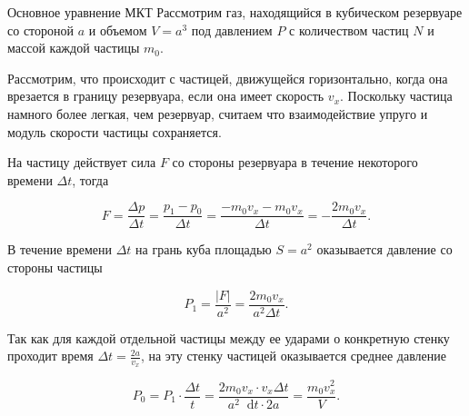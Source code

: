 \documentclass{article}
\renewcommand{\d}{\mathop{}\!\mathrm{d}}
\newcommand{\abs}[1]{\lvert#1\rvert}
\begin{document}
	\begin{section}{Основное уравнение МКТ}
		Рассмотрим газ, находящийся в кубическом резервуаре со стороной $a$ и объемом $V = a^3$ под давлением $P$ с количеством частиц $N$ и массой каждой частицы $m_0$.

		Рассмотрим, что происходит с частицей, движущейся горизонтально, когда она врезается в границу резервуара, если она имеет скорость $v_x$. Поскольку частица намного более легкая, чем резервуар, считаем что взаимодействие упруго и модуль скорости частицы сохраняется.

		\begin{multicols}{2}

		\end{multicols}

		На частицу действует сила $F$ со стороны резервуара в течение некоторого времени $\Delta t$, тогда

		\begin{equation*}
			F = \frac{\Delta p}{\Delta t} = \frac{p_1 - p_0}{\Delta t} = \frac{-m_0 v_x - m_0 v_x}{\Delta t} = -\frac{2 m_0 v_x}{\Delta t}.
		\end{equation*}

		В течение времени $\Delta t$ на грань куба площадью $S = a^2$ оказывается давление со стороны частицы

		\begin{equation*}
			P_1 = \frac{\abs{F}}{a^2} = \frac{2 m_0 v_x}{a^2 \Delta t}.
		\end{equation*}

		Так как для каждой отдельной частицы между ее ударами о конкретную стенку проходит время $\Delta t = \frac{2a}{v_x}$, на эту стенку частицей оказывается среднее давление

		\begin{equation*}
			P_0 = P_1 \cdot \frac{\Delta t}{t} = \frac{2 m_0 v_x \cdot v_x \Delta t}{a^2 \d t \cdot 2a} = \frac{m_0 v_x^2}{V}.
		\end{equation*}


\end{section}
\end{document}
